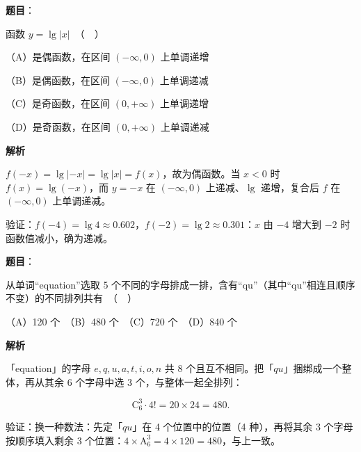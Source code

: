 \begin{answer}

\textbf{题目}：

函数 $y = \lg |x|$　（　）

（A）是偶函数，在区间 $(-\infty, 0)$ 上单调递增

（B）是偶函数，在区间 $(-\infty, 0)$ 上单调递减

（C）是奇函数，在区间 $(0, +\infty)$ 上单调递增

（D）是奇函数，在区间 $(0, +\infty)$ 上单调递减

\textbf{解析}

$f(-x)=\lg|-x|=\lg|x|=f(x)$，故为偶函数。当 $x<0$ 时 $f(x)=\lg(-x)$，而 $y=-x$ 在 $(-\infty,0)$ 上递减、$\lg$ 递增，复合后 $f$ 在 $(-\infty,0)$ 上单调递减。

验证：$f(-4)=\lg4\approx0.602$，$f(-2)=\lg2\approx0.301$：$x$ 由 $-4$ 增大到 $-2$ 时函数值减小，确为递减。


\par\medskip

\end{answer}
\begin{answer}

\textbf{题目}：

从单词“equation”选取 5 个不同的字母排成一排，含有“qu”（其中“qu”相连且顺序不变）的不同排列共有　（　）

（A）120 个　（B）480 个　（C）720 个　（D）840 个

\textbf{解析}

「equation」的字母 $e,q,u,a,t,i,o,n$ 共 8 个且互不相同。把「$qu$」捆绑成一个整体，再从其余 6 个字母中选 3 个，与整体一起全排列：

\nopagebreak[4]
\[\mathrm C_6^3\cdot 4!=20\times24=480 .\]

验证：换一种数法：先定「$qu$」在 4 个位置中的位置（4 种），再将其余 3 个字母按顺序填入剩余 3 个位置：$4\times \mathrm A_6^3=4\times120=480$，与上一致。


\par\medskip

\end{answer}
